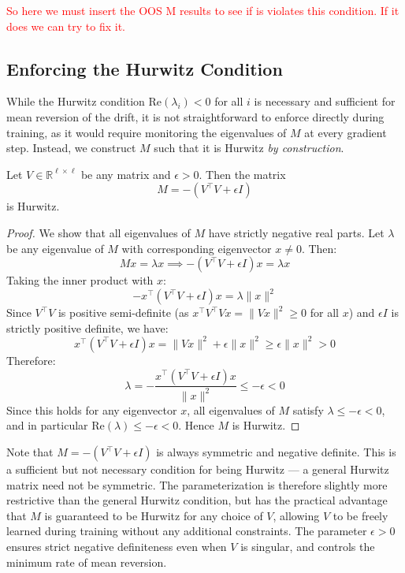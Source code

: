 \textcolor{red}{So here we must insert the OOS M results to see if is violates this condition. If it does we can try to fix it.}



\subsection*{Enforcing the Hurwitz Condition}

While the Hurwitz condition $\mathrm{Re}(\lambda_i) < 0$ for all $i$ is 
necessary and sufficient for mean reversion of the drift, it is not 
straightforward to enforce directly during training, as it would require 
monitoring the eigenvalues of $M$ at every gradient step. Instead, we 
construct $M$ such that it is Hurwitz \emph{by construction}.

\begin{proposition}
Let $V \in \mathbb{R}^{\ell \times \ell}$ be any matrix and $\epsilon > 0$. 
Then the matrix
\[
M = -(V^\top V + \epsilon I)
\]
is Hurwitz.
\end{proposition}

\begin{proof}
We show that all eigenvalues of $M$ have strictly negative real parts.
Let $\lambda$ be any eigenvalue of $M$ with corresponding eigenvector 
$x \neq 0$. Then:
\[
Mx = \lambda x \implies -(V^\top V + \epsilon I)x = \lambda x
\]
Taking the inner product with $x$:
\[
-x^\top(V^\top V + \epsilon I)x = \lambda \|x\|^2
\]
Since $V^\top V$ is positive semi-definite (as $x^\top V^\top V x = 
\|Vx\|^2 \geq 0$ for all $x$) and $\epsilon I$ is strictly positive 
definite, we have:
\[
x^\top(V^\top V + \epsilon I)x = \|Vx\|^2 + \epsilon\|x\|^2 \geq 
\epsilon\|x\|^2 > 0
\]
Therefore:
\[
\lambda = -\frac{x^\top(V^\top V + \epsilon I)x}{\|x\|^2} \leq 
-\epsilon < 0
\]
Since this holds for any eigenvector $x$, all eigenvalues of $M$ satisfy 
$\lambda \leq -\epsilon < 0$, and in particular 
$\mathrm{Re}(\lambda) \leq -\epsilon < 0$. Hence $M$ is Hurwitz. 
\end{proof}

\begin{remark}
Note that $M = -(V^\top V + \epsilon I)$ is always symmetric and negative 
definite. This is a sufficient but not necessary condition for being 
Hurwitz --- a general Hurwitz matrix need not be symmetric. The 
parameterization is therefore slightly more restrictive than the general 
Hurwitz condition, but has the practical advantage that $M$ is guaranteed 
to be Hurwitz for any choice of $V$, allowing $V$ to be freely learned 
during training without any additional constraints. The parameter 
$\epsilon > 0$ ensures strict negative definiteness even when $V$ is 
singular, and controls the minimum rate of mean reversion.
\end{remark}


